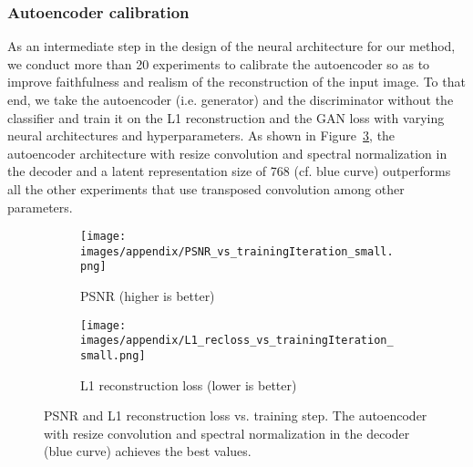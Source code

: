 \documentclass[12pt,a4paper]{article}
\begin{document}


\subsubsection{Autoencoder calibration}\label{sec:ae_calibration}
As an intermediate step in the design of the neural architecture for our method, we conduct more than 20 experiments to calibrate the autoencoder so as to improve faithfulness and realism of the reconstruction of the input image. To that end, we take the autoencoder (i.e. generator) and the discriminator without the classifier and train it on the L1 reconstruction and the GAN loss with varying neural architectures and hyperparameters. As shown in Figure~\ref{fig:ae_calib_graphs}, the autoencoder architecture with resize convolution and spectral normalization in the decoder and a latent representation size of 768 (cf. blue curve) outperforms all the other experiments that use transposed convolution among other parameters.
\begin{figure}[h]
\begin{subfigure}{0.49\textwidth}
\texttt{[image: images/appendix/PSNR\_vs\_trainingIteration\_small.png]} 
\caption{PSNR (higher is better)}
\label{fig:ae_calib_psnr}
\end{subfigure}
\begin{subfigure}{0.49\textwidth}
\texttt{[image: images/appendix/L1\_recloss\_vs\_trainingIteration\_small.png]}
\caption{L1 reconstruction loss (lower is better)}
\label{fig:ae_calib_l1recloss}
\end{subfigure}
\caption{PSNR and L1 reconstruction loss vs. training step. The autoencoder with resize convolution and spectral normalization in the decoder (blue curve) achieves the best values.}
\label{fig:ae_calib_graphs}
\end{figure}
\end{document}
